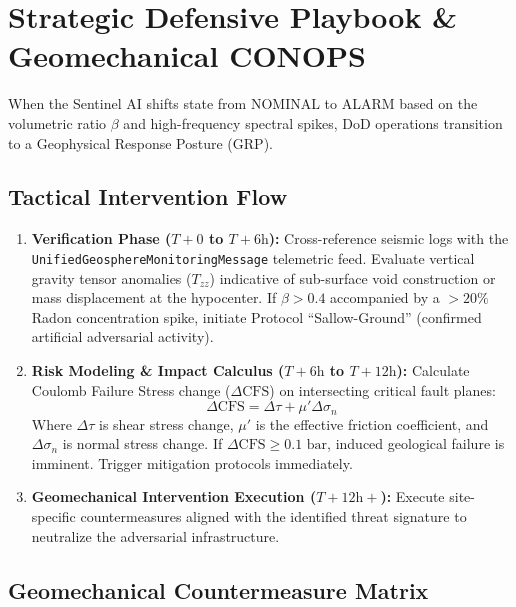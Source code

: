 \documentclass[11pt,a4paper]{article}
\begin{document}
\section{Strategic Defensive Playbook \& Geomechanical CONOPS}

When the Sentinel AI shifts state from NOMINAL to ALARM based on the volumetric ratio $\beta$ and high-frequency spectral spikes, DoD operations transition to a Geophysical Response Posture (GRP).

\subsection{Tactical Intervention Flow}
\begin{enumerate}
    \item \textbf{Verification Phase ($T+0$ to $T+6\text{h}$):}
    Cross-reference seismic logs with the \texttt{UnifiedGeosphereMonitoringMessage} telemetric feed. Evaluate vertical gravity tensor anomalies ($T_{zz}$) indicative of sub-surface void construction or mass displacement at the hypocenter. If $\beta > 0.4$ accompanied by a $>20\%$ Radon concentration spike, initiate Protocol ``Sallow-Ground'' (confirmed artificial adversarial activity).
    
    \item \textbf{Risk Modeling \& Impact Calculus ($T+6\text{h}$ to $T+12\text{h}$):}
    Calculate Coulomb Failure Stress change ($\Delta \text{CFS}$) on intersecting critical fault planes:
    \begin{equation}
    \Delta \text{CFS} = \Delta \tau + \mu' \Delta \sigma_n
    \end{equation}
    Where $\Delta \tau$ is shear stress change, $\mu'$ is the effective friction coefficient, and $\Delta \sigma_n$ is normal stress change. If $\Delta \text{CFS} \ge 0.1\text{ bar}$, induced geological failure is imminent. Trigger mitigation protocols immediately.
    
    \item \textbf{Geomechanical Intervention Execution ($T+12\text{h}+$):}
    Execute site-specific countermeasures aligned with the identified threat signature to neutralize the adversarial infrastructure.
\end{enumerate}

\subsection{Geomechanical Countermeasure Matrix}
\end{document}
